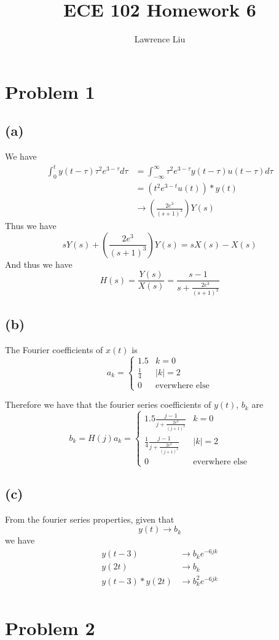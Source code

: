 \documentclass[12pt]{article}
\title{ECE 102 Homework 6}
\author{Lawrence Liu}
\begin{document}
\maketitle
\section{Problem 1}
\subsection*{(a)}
We have
\begin{align*}
\int_0^t y(t-\tau)\tau^2e^{3-\tau} d\tau &=\int_{-\infty}^{\infty}\tau^2e^{3-\tau}y(t-\tau)u(t-\tau)d\tau\\ 
&=\left(t^2e^{3-t}u(t)\right)*y(t)\\
&\to \left(\frac{2e^3}{(s+1)^3}\right)Y(s)
\end{align*}
Thus we have
$$sY(s)+\left(\frac{2e^3}{(s+1)^3}\right)Y(s)=sX(s)-X(s)$$
And thus we have
$$H(s)=\frac{Y(s)}{X(s)}=\frac{s-1}{s+\frac{2e^3}{(s+1)^3}}$$
\subsection*{(b)}
The Fourier coefficients of $x(t)$ is
$$a_k=\begin{cases}
1.5 & k=0\\
\frac{1}{4} & |k|=2\\
0 & \text{everwhere else}
\end{cases}
$$

Therefore we have that the fourier series coefficients of $y(t)$, $b_k$ are
$$b_k=H(j)a_k=\begin{cases}
1.5\frac{j-1}{j+\frac{2e^3}{(j+1)^3}}& k=0\\
\frac{1}{4}\frac{j-1}{j+\frac{2e^3}{(j+1)^3}} & |k|=2\\
0 & \text{everwhere else}
\end{cases}$$
\subsection*{(c)}
From the fourier series properties,  given that
$$y(t)\to b_k$$
we have
\begin{align*}
y(t-3) &\to b_k e^{-6jk}\\
y(2t) &\to b_k\\
y(t-3)*y(2t) &\to b_k^2 e^{-6jk}\\
\end{align*}
\section*{Problem 2}
\end{document}
